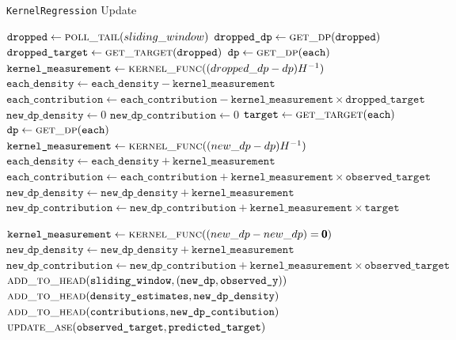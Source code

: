 \begin{algorithm}
  \caption{\texttt{KernelRegression} Update}\label{alg:kreg_update_routine}
  \begin{algorithmic}[1]
    	\State $\texttt{dropped} \gets \textsc{poll\_tail}(sliding\_window)$
    	\State $\texttt{dropped\_dp} \gets \textsc{get\_dp}(\texttt{dropped})$
    	\State $\texttt{dropped\_target} \gets \textsc{get\_target}(\texttt{dropped})$
    		\State $\texttt{dp} \gets \textsc{get\_dp}(\texttt{each})$
    		\State $\texttt{kernel\_measurement} \gets \textsc{kernel\_func}((dropped\_dp-dp)H^{-1})$
    		\State $\texttt{each\_density} \gets \texttt{each\_density} - \texttt{kernel\_measurement}$
    		\State $\texttt{each\_contribution} \gets \texttt{each\_contribution} - \texttt{kernel\_measurement}\times\texttt{dropped\_target}$
    	\EndWhile
  		\State $\texttt{new\_dp\_density} \gets 0$
  		\State $\texttt{new\_dp\_contribution} \gets 0$
    		\State $\texttt{target} \gets \textsc{get\_target}(\texttt{each})$
    		\State $\texttt{dp} \gets \textsc{get\_dp}(\texttt{each})$
    		\State $\texttt{kernel\_measurement} \gets \textsc{kernel\_func}((new\_dp-dp)H^{-1})$
    		\State $\texttt{each\_density} \gets \texttt{each\_density} + \texttt{kernel\_measurement}$
    		\State $\texttt{each\_contribution} \gets \texttt{each\_contribution} + \texttt{kernel\_measurement}\times\texttt{observed\_target}$
    		\State $\texttt{new\_dp\_density} \gets \texttt{new\_dp\_density} + \texttt{kernel\_measurement}$
    		\State $\texttt{new\_dp\_contribution} \gets \texttt{new\_dp\_contribution} + \texttt{kernel\_measurement}\times\texttt{target}$
    	\EndWhile
    	
    	\State $\texttt{kernel\_measurement} \gets \textsc{kernel\_func}((new\_dp-new\_dp)=\pmb{0})$
    	\State $\texttt{new\_dp\_density} \gets \texttt{new\_dp\_density} + \texttt{kernel\_measurement}$
    	\State $\texttt{new\_dp\_contribution} \gets \texttt{new\_dp\_contribution} + \texttt{kernel\_measurement}\times\texttt{observed\_target}$
    	\State $\textsc{add\_to\_head}(\texttt{sliding\_window}, (\texttt{new\_dp}, \texttt{observed\_y}))$
		\State $\textsc{add\_to\_head}(\texttt{density\_estimates}, \texttt{new\_dp\_density})$
		\State $\textsc{add\_to\_head}(\texttt{contributions}, \texttt{new\_dp\_contibution})$
		\State $\textsc{update\_ase}(\texttt{observed\_target}, \texttt{predicted\_target})$
   \EndProcedure
  \end{algorithmic}
\end{algorithm}

